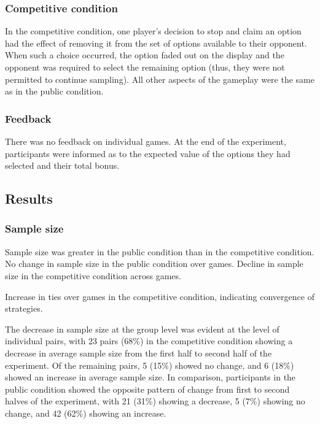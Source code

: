 \documentclass[11pt,jou]{apa6}
\begin{document}
\subsubsection{Competitive condition}

In the competitive condition, one player's decision to stop and claim an option had the effect of removing it from the set of options available to their opponent.
When such a choice occurred, the option faded out on the display and the opponent was required to select the remaining option (thus, they were not permitted to continue sampling).
All other aspects of the gameplay were the same as in the public condition.

\subsubsection{Feedback}

There was no feedback on individual games.
At the end of the experiment, participants were informed as to the expected value of the options they had selected and their total bonus.



\subsection{Results}




\subsubsection{Sample size}

Sample size was greater in the public condition than in the competitive condition. No change in sample size in the public condition over games. Decline in sample size in the competitive condition across games.

Increase in ties over games in the competitive condition, indicating convergence of strategies.

The decrease in sample size at the group level was evident at the level of individual pairs, with 23 pairs (68\%) in the competitive condition showing a decrease in average sample size from the first half to second half of the experiment. Of the remaining pairs, 5 (15\%) showed no change, and 6 (18\%) showed an increase in average sample size.
In comparison, participants in the public condition showed the opposite pattern of change from first to second halves of the experiment, with 21 (31\%) showing a decrease, 5 (7\%) showing no change, and 42 (62\%) showing an increase.
\end{document}
